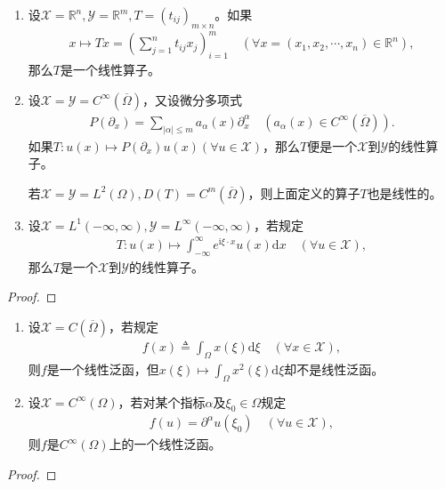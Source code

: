 \documentclass[../../main.tex]{subfiles}%
\begin{document}
\begin{proposition}
\begin{enumerate}[(1)]
\item 设$\mathscr{X}=\mathbb{R}^n,\mathscr{Y}=\mathbb{R}^m,T=(t_{ij})_{m\times n}$。如果
\begin{align*}
x\mapsto Tx=\left( \sum\limits_{j=1}^n t_{ij}x_j \right)_{i=1}^m\quad (\forall x=(x_1,x_2,\cdots,x_n)\in\mathbb{R}^n),
\end{align*}
那么$T$是一个线性算子。

\item 设$\mathscr{X}=\mathscr{Y}=C^\infty(\overline{\Omega})$，又设微分多项式
\begin{align*}
P(\partial_x)=\sum\limits_{|\alpha|\leqslant m} a_\alpha(x)\partial_x^\alpha\quad (a_\alpha(x)\in C^\infty(\overline{\Omega})).
\end{align*}
如果$T:u(x)\mapsto P(\partial_x)u(x)(\forall u\in\mathscr{X})$，那么$T$便是一个$\mathscr{X}$到$\mathscr{Y}$的线性算子。

若$\mathscr{X}=\mathscr{Y}=L^2(\Omega),D(T)=C^m(\overline{\Omega})$，则上面定义的算子$T$也是线性的。

\item 设$\mathscr{X}=L^1(-\infty,\infty),\mathscr{Y}=L^\infty(-\infty,\infty)$，若规定
\begin{align*}
T:u(x)\mapsto \int_{-\infty}^\infty e^{\mathrm{i}\xi\cdot x}u(x)\mathrm{d}x\quad (\forall u\in\mathscr{X}),
\end{align*}
那么$T$是一个$\mathscr{X}$到$\mathscr{Y}$的线性算子。
\end{enumerate}
\end{proposition}
\begin{proof}
\end{proof}

\begin{proposition}
\begin{enumerate}[(1)]
\item 设$\mathscr{X}=C(\overline{\Omega})$，若规定
\begin{align*}
f(x)\triangleq \int_\Omega x(\xi)\mathrm{d}\xi\quad (\forall x\in\mathscr{X}),
\end{align*}
则$f$是一个线性泛函，但$x(\xi)\mapsto \int_\Omega x^2(\xi)\mathrm{d}\xi$却不是线性泛函。

\item 设$\mathscr{X}=C^\infty(\Omega)$，若对某个指标$\alpha$及$\xi_0\in\Omega$规定
\begin{align*}
f(u)=\partial^\alpha u(\xi_0)\quad (\forall u\in\mathscr{X}),
\end{align*}
则$f$是$C^\infty(\Omega)$上的一个线性泛函。
\end{enumerate}
\end{proposition}
\begin{proof}
\end{proof}
\end{document}
